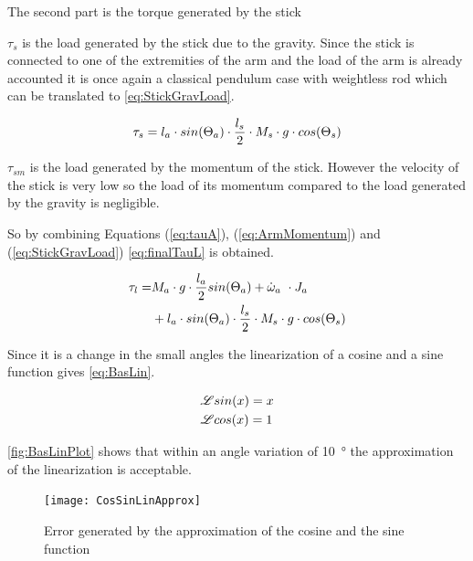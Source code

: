 The second part is the torque generated by the stick

$\tau_s$ is the load generated by the stick due to the gravity. Since the stick is connected to one of the extremities of the arm and the load of the arm is already accounted it is once again a classical pendulum case with weightless rod which can be translated to \autoref{eq:StickGravLoad}.

\begin{equation}\label{eq:StickGravLoad}
	\tau_s = l_a\cdot sin(\Theta_a) \cdot \frac{l_s}{2}\cdot M_s\cdot g\cdot cos(\Theta_s) \addunit{\newton\meter}
\end{equation}

$\tau_{sm}$ is the load generated by the momentum of the stick. However the velocity of the stick is very low so the load of its momentum compared to the load generated by the gravity is negligible. 

So by combining Equations (\ref{eq:tauA}), (\ref{eq:ArmMomentum}) and (\ref{eq:StickGravLoad}) \autoref{eq:finalTauL} is obtained.

\begin{equation}\label{eq:finalTauL}
	\begin{flalign}
	\tau_l=&M_a\cdot g \cdot \frac{l_a}{2} sin(\Theta_a)+\dot\omega_a\ \cdot J_a \\
	&+l_a\cdot sin(\Theta_a) \cdot \frac{l_s}{2}\cdot M_s\cdot g\cdot cos(\Theta_s) \addunit{\newton\meter}
	\end{flalign}
\end{equation}

Since it is a change in the small angles the linearization of a cosine and a sine function gives \autoref{eq:BasLin}.

\begin{subequations}\label{eq:BasLin}
	\begin{flalign}
		&\mathscr{L}{sin(x)}=x \addunit{1}\\
		&\mathscr{L}{cos(x)}=1 \addunit{1}
	\end{flalign}
\end{subequations}

\autoref{fig:BasLinPlot} shows that within an angle variation of \SI{10}{\degree} the approximation of the linearization is acceptable.

\begin{figure}[htbp]
	\centering
	\texttt{[image: CosSinLinApprox]}
	\caption{Error generated by the approximation of the cosine and the sine function}\label{fig:BasLinPlot}
\end{figure}